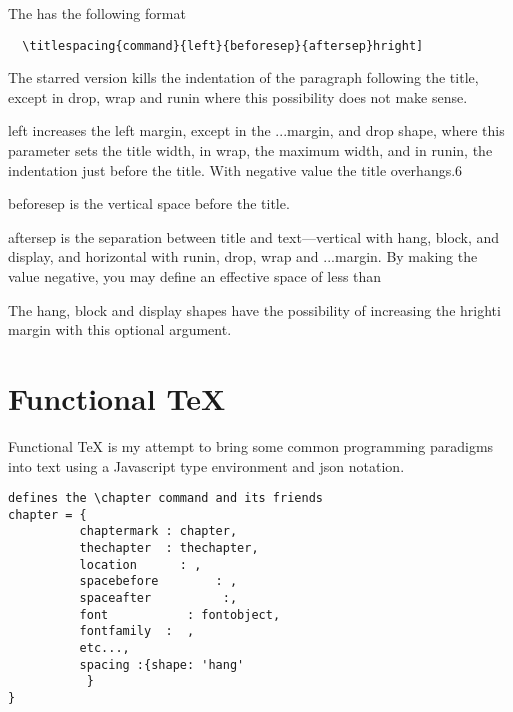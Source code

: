 The  has the following format
\begin{verbatim}
  \titlespacing{command}{left}{beforesep}{aftersep}hright]
\end{verbatim}

The starred version kills the indentation of the paragraph following the title, except in drop, wrap and
runin where this possibility does not make sense.

 left increases the left margin, except in the ...margin, and drop shape, where this parameter
sets the title width, in wrap, the maximum width, and in runin, the indentation just before the
title. With negative value the title overhangs.6

 beforesep is the vertical space before the title.

 aftersep is the separation between title and text—vertical with hang, block, and display, and
horizontal with runin, drop, wrap and ...margin. By making the value negative, you may
define an effective space of less than \parskip 7pt

 The hang, block and display shapes have the possibility of increasing the hrighti margin with
this optional argument.

\section{Functional TeX}

Functional TeX  is my attempt to bring some common programming paradigms into
text using a Javascript type environment and json notation.

\begin{Verbatim}
defines the \chapter command and its friends
chapter = {
          chaptermark : chapter, 
          thechapter  : thechapter,
          location      : ,
          spacebefore        : ,
          spaceafter          :,
          font           : fontobject,
          fontfamily  :  ,
          etc...,
          spacing :{shape: 'hang'
           }                     
}     
\end{Verbatim}


















